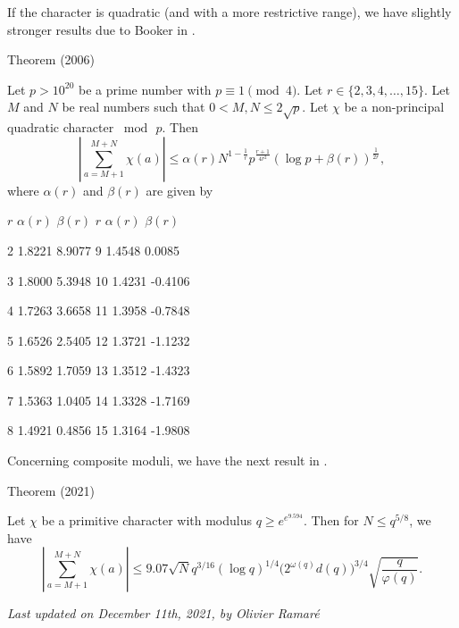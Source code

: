 If the character is quadratic (and with a more restrictive
range), we have slightly stronger results due to Booker in  
\cite{Booker*06}.
\par 
\begin{thm}{Theorem (2006)}

Let $p > 10^{20}$ be a prime number with $p \equiv 1 \pmod{4}$. Let
$r\in \{2,3,4,\ldots,15\}$. Let $M$ and $N$ be real numbers such that
$0 < M , N \le 2\sqrt{p}$. Let $\chi$ be a non-principal quadratic
character $\bmod{\,p}$.  Then
$$
\left|\sum_{a=M+1}^{M+N}\chi(a)\right|
\le \alpha(r) N^{1-\frac{1}{r}} p^{\frac{r+1}{4r^2}}\left(\log{p} +
     \beta(r)\right)^{\frac{1}{2r}},
$$
     where $\alpha(r)$ and $\beta(r)$ are given by

  
  
    
      $r$
      $\alpha(r)$
      $\beta(r)$
      $r$
      $\alpha(r)$
      $\beta(r)$
    
  
  
    2
    1.8221
    8.9077
    9
    1.4548
    0.0085
  
  
    3
    1.8000
    5.3948
    10
    1.4231
    -0.4106
  
  
    4
    1.7263
    3.6658
    11
    1.3958
    -0.7848
  
  
    5
    1.6526
    2.5405
    12
    1.3721
    -1.1232
  
  
    6
    1.5892
    1.7059
    13
    1.3512
     -1.4323
  
  
    7
    1.5363
    1.0405
    14
    1.3328
    -1.7169
  
  
    8
     1.4921
    0.4856
    15
    1.3164
    -1.9808
  
  

\end{thm}


Concerning composite moduli, we have the next result in
\cite{Jain-Sharma-Khale-Liu*21}
.
\par 
\begin{thm}{Theorem (2021)}

  Let $\chi$ be a primitive character with modulus $q\ge e^{e^{9.594}}$.
  Then for $N\le q^{5/8}$, we have
$$
\left|\sum_{a=M+1}^{M+N}\chi(a)\right|
  \le 9.07 \sqrt{N}q^{3/16}(\log q)^{1/4}
  \bigl(2^{\omega(q)}d(q)\bigr)^{3/4}
  \sqrt{\frac{q}{\varphi(q)}}.
$$
\end{thm}

\par 


 
 








  
\begin{flushright}\small\sl{}   Last updated on December 11th, 2021, by Olivier Ramar\'e
 \end{flushright}















